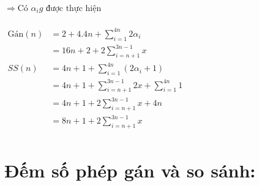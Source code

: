 \documentclass[12pt, letterpaper]{article}
\begin{document}
	$\Rightarrow \text{Có } \alpha_i g \text{ được thực hiện }$  \\
	 \\
	$ \begin{aligned}
		\text{Gán}(n) & = 2 + 4.4n + \sum^{4n}_{i = 1} 2 \alpha_i \\
			& = 16n + 2 + 2 \sum^{3n-1}_{i = n + 1} x\\
		SS(n) & = 4n + 1 + \sum^{4n}_{i = 1} (2 \alpha_i + 1) \\
			& = 4n + 1 + \sum^{3n-1}_{i = n + 1} 2x + \sum^{4n}_{i = 1} 1 \\
			& = 4n + 1 + 2\sum^{3n-1}_{i = n + 1} x + 4n \\
			& = 8n + 1 + 2\sum^{3n-1}_{i = n + 1} x \\
	\end{aligned} $ \\
\section{Đếm số phép gán và so sánh:}
\end{document}
